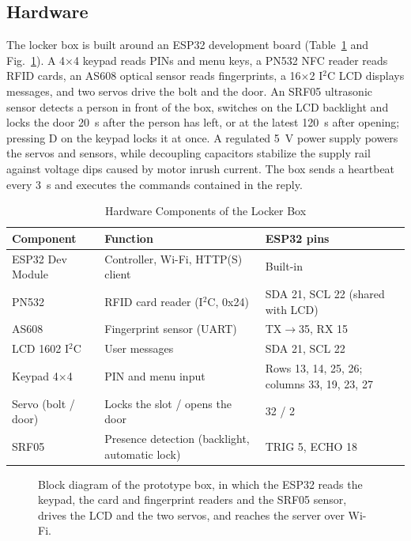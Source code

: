 \subsection{Hardware}

The locker box is built around an ESP32 development board (Table~\ref{tab:hw} and Fig.~\ref{fig:block}). A 4$\times$4
keypad reads PINs and menu keys, a PN532 NFC reader reads RFID cards, an AS608 optical sensor reads fingerprints, a
16$\times$2 I$^2$C LCD displays messages, and two servos drive the bolt and the door. An SRF05 ultrasonic sensor
detects a person in front of the box, switches on the LCD backlight and locks the door 20~s after the person has left,
or at the latest 120~s after opening; pressing D on the keypad locks it at once. A regulated 5~V power supply powers the
servos and sensors, while decoupling capacitors stabilize the supply rail against voltage dips caused by motor inrush
current. The box sends a heartbeat every 3~s and executes the commands contained in the reply.

\begin{table}[!htbp]
\renewcommand{\arraystretch}{1.1}
\centering
\small
\caption{Hardware Components of the Locker Box}
\label{tab:hw}
\begin{tabular}{l l l}
\hline
Component & Function & ESP32 pins \\
\hline
ESP32 Dev Module & Controller, Wi-Fi, HTTP(S) client & Built-in \\
PN532 & RFID card reader (I$^2$C, 0x24) & SDA 21, SCL 22 (shared with LCD) \\
AS608 & Fingerprint sensor (UART) & TX$\rightarrow$35, RX 15 \\
LCD 1602 I$^2$C & User messages & SDA 21, SCL 22 \\
Keypad 4$\times$4 & PIN and menu input & Rows 13, 14, 25, 26; columns 33, 19, 23, 27 \\
Servo (bolt / door) & Locks the slot / opens the door & 32 / 2 \\
SRF05 & Presence detection (backlight, automatic lock) & TRIG 5, ECHO 18 \\
\hline
\end{tabular}
\end{table}

\begin{figure}[!htbp]
\centering

\caption{Block diagram of the prototype box, in which the ESP32 reads the keypad, the card and fingerprint readers and
the SRF05 sensor, drives the LCD and the two servos, and reaches the server over Wi-Fi.}
\label{fig:block}
\end{figure}

